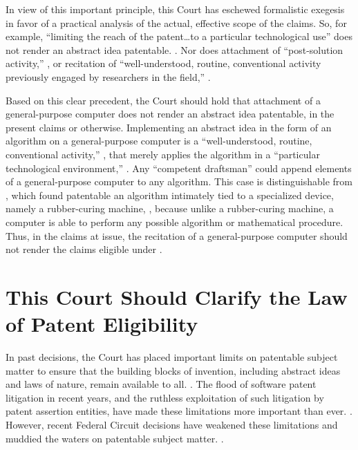 \documentclass{scotus}
\begin{document}
In view of this important principle, this Court has eschewed
formalistic exegesis in favor of a practical analysis of the actual, effective
scope of the claims.
So, for example,
``limiting the reach of the patent\ldots to a
particular technological use'' does not render an abstract idea patentable.
. Nor does attachment of
``post-solution activity,''
,
or
recitation of ``well-understood, routine, conventional activity previously
engaged by researchers in the field,''
.

Based on this clear precedent, the Court should hold that
attachment of a general-purpose computer does not render an abstract idea
patentable, in the present claims or otherwise.
Implementing an
abstract idea in the form of an algorithm on a general-purpose computer is a
``well-understood, routine, conventional activity,'' , that
merely
applies the algorithm in a ``particular technological environment,''
.
Any ``competent draftsman'' could append elements of a
general-purpose computer to any algorithm.
This case is distinguishable from , which found patentable an
algorithm intimately tied to a specialized device, namely a rubber-curing
machine, , because unlike a rubber-curing machine, a
computer is able to perform any possible algorithm or mathematical
procedure.
Thus, in the claims at issue, the recitation of a general-purpose computer
should not render the claims eligible under .



%
%
\section{This Court Should Clarify the Law of Patent Eligibility}

In past decisions, the Court has placed important limits on patentable subject
matter to ensure that the building blocks of invention, including abstract ideas
and laws of nature, remain available to all. .  The flood
of software patent litigation in recent years, and the ruthless exploitation of
such litigation by patent assertion entities, have made these limitations more
important than ever. . However, recent Federal
Circuit decisions have weakened these limitations and muddied the waters on
patentable subject matter.  .
\end{document}
